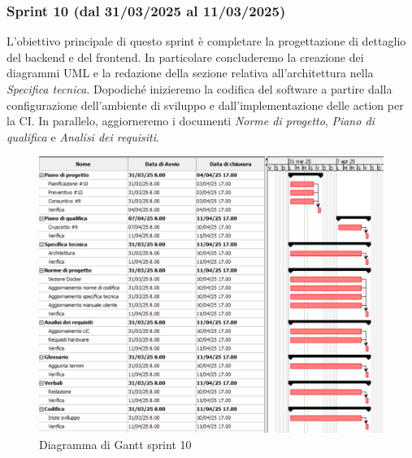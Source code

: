 \subsubsection{Sprint 10 (dal 31/03/2025 al 11/03/2025)}  
L'obiettivo principale di questo sprint è completare la progettazione di dettaglio del backend e del frontend. In particolare concluderemo la creazione dei diagrammi UML e la redazione della sezione relativa all'architettura nella
 \textit{Specifica tecnica}. Dopodiché inizieremo la codifica del software a partire dalla configurazione dell'ambiente di sviluppo e dall'implementazione delle action per la CI.
In parallelo, aggiorneremo i documenti \textit{Norme di progetto}, \textit{Piano di qualifica} e \textit{Analisi dei requisiti}.
\begin{figure}[h!]
    \centering
    \includegraphics[scale = 0.5]{template/images/gantt10.png}
    \caption{Diagramma di Gantt sprint 10}
    \label{fig:3.10} %
\end{figure}
